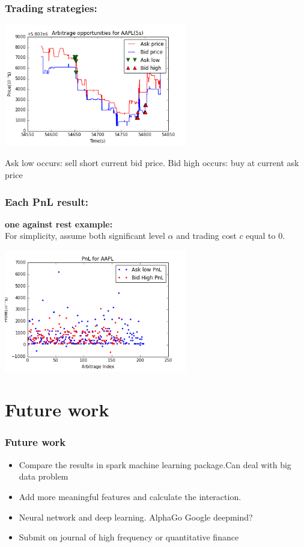 \documentclass[xcolor={x11names,svgnames,dvipsnames}]{beamer}
\begin{document}
\begin{frame}
\frametitle{Trading strategies:}


\begin{center}
     \includegraphics[width=0.6\textwidth, height=0.6\textheight]{arbitrage_plot.png}
\end{center}    
Ask low occurs: sell short current bid price. Bid high occurs: buy at current ask price
\end{frame}


\begin{frame}
\frametitle{Each PnL result:}
\textbf{one against rest example:}\\
For simplicity, assume both significant level $\alpha$ and trading cost $c$ equal to 0.
\begin{center}
     \includegraphics[width=0.6\textwidth, height=0.6\textheight]{AAPL_pnl.png}
\end{center}    

\end{frame}


\section{Future work}
\begin{frame}
\frametitle{Future work}
    \begin{itemize}
        \item  Compare the results in spark machine learning package.Can deal with big data problem 
        \item  Add more meaningful features and calculate the interaction.
        \item  Neural network and deep learning.  AlphaGo Google deepmind?
        \item  Submit on journal of high frequency or quantitative finance 
      \end{itemize}
\end{frame}
\end{document}
